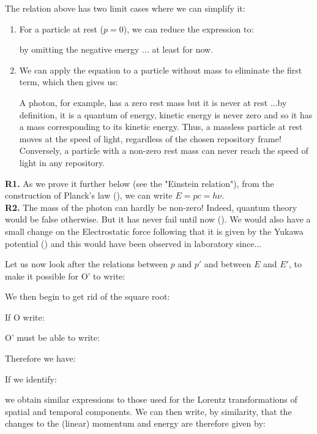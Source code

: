 	The relation above has two limit cases where we can simplify it:
	\begin{enumerate}
		\item For a particle at rest ($p = 0$), we can reduce the expression to:
		
		by omitting the negative energy ... at least for now.

		\item We can apply the equation to a particle without mass to eliminate the first term, which then gives us:
		
		A photon, for example, has a zero rest mass but it is never at rest ...by definition, it is a quantum of energy, kinetic energy is never zero and so it has a mass corresponding to its kinetic energy. Thus, a massless particle at rest moves at the speed of light, regardless of the chosen repository frame! Conversely, a particle with a non-zero rest mass can never reach the speed of light in any repository.
	\end{enumerate}
	\begin{tcolorbox}[title=Remarks,colframe=black,arc=10pt]
	\textbf{R1.} As we prove it further below (see the "Einstein relation"), from the construction of Planck's law (), we can write $E=pc=h\nu$.\\
	
	\textbf{R2.} The mass of the photon can hardly be non-zero! Indeed, quantum theory would be false otherwise. But it has never fail until now (). We would also have a small change on the Electrostatic force following that it is given by the Yukawa potential () and this would have been observed in laboratory since...
	\end{tcolorbox}
	Let us now look after the relations between $p$ and $p'$ and between $E$ and $E'$, to make it possible for O' to write:
	
	We then begin to get rid of the square root:
	
	If O write:
	
	O' must be able to write:
	
	Therefore we have:
	
	If we identify:
	
	we obtain similar expressions to those used for the Lorentz transformations of spatial and temporal components. We can then write, by similarity, that the changes to the (linear) momentum and energy are therefore given by:
	
